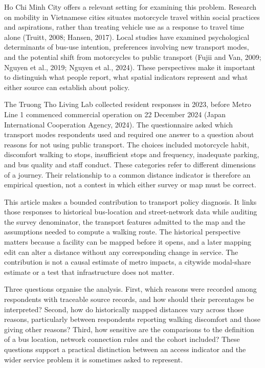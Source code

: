 \documentclass[
  11pt,
  a4paper,
]{article}
\begin{document}
Ho Chi Minh City offers a relevant setting for examining this problem.
Research on mobility in Vietnamese cities situates motorcycle travel
within social practices and aspirations, rather than treating vehicle
use as a response to travel time alone (Truitt, 2008; Hansen, 2017).
Local studies have examined psychological determinants of bus-use
intention, preferences involving new transport modes, and the potential
shift from motorcycles to public transport (Fujii and Van, 2009; Nguyen
et al., 2019; Nguyen et al., 2024). These perspectives make it important
to distinguish what people report, what spatial indicators represent and
what either source can establish about policy.

The Truong Tho Living Lab collected resident responses in 2023, before
Metro Line 1 commenced commercial operation on 22 December 2024 (Japan
International Cooperation Agency, 2024). The questionnaire asked which
transport modes respondents used and required one answer to a question
about reasons for not using public transport. The choices included
motorcycle habit, discomfort walking to stops, insufficient stops and
frequency, inadequate parking, and bus quality and staff conduct. These
categories refer to different dimensions of a journey. Their
relationship to a common distance indicator is therefore an empirical
question, not a contest in which either survey or map must be correct.

This article makes a bounded contribution to transport policy diagnosis.
It links those responses to historical bus-location and street-network
data while auditing the survey denominator, the transport features
admitted to the map and the assumptions needed to compute a walking
route. The historical perspective matters because a facility can be
mapped before it opens, and a later mapping edit can alter a distance
without any corresponding change in service. The contribution is not a
causal estimate of metro impacts, a citywide modal-share estimate or a
test that infrastructure does not matter.

Three questions organise the analysis. First, which reasons were
recorded among respondents with traceable source records, and how should
their percentages be interpreted? Second, how do historically mapped
distances vary across those reasons, particularly between respondents
reporting walking discomfort and those giving other reasons? Third, how
sensitive are the comparisons to the definition of a bus location,
network connection rules and the cohort included? These questions
support a practical distinction between an access indicator and the
wider service problem it is sometimes asked to represent.
\end{document}
